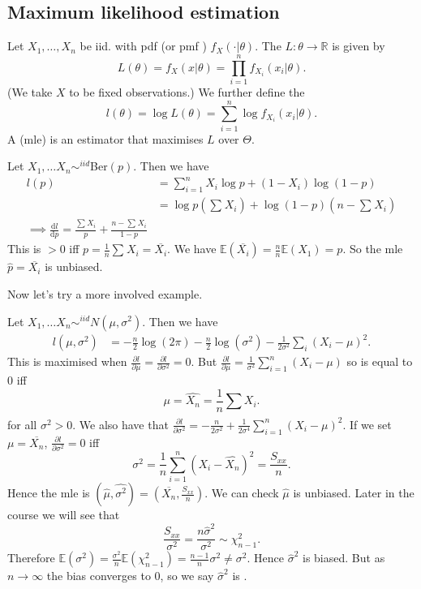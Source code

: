 \documentclass[egregdoesnotlikesansseriftitles,a4paper]{scrartcl}
\begin{document}
\subsection{Maximum likelihood estimation}
\begin{definition*}
     Let $X_1 , \ldots ,X_n $ be iid. with pdf (or pmf ) $f_{X}(\cdot | \theta)$. The  $L: \theta \rightarrow \mathbb{R}$ is given by \[
     L (\theta)=f_{X}(x| \theta)=\prod_{i=1}^n f_{X_i}(x_{i}| \theta)
     .\] (We take $X$ to be fixed observations.) We further define the  \[
     l (\theta)=\log L (\theta)=\sum_{i=1}^{n}\log f_{X_i}(x_{i}| \theta)
     .\]A  (mle) is an estimator that maximises $L$ over $\Theta$.
\end{definition*}
\begin{example*}
      Let $X_1 , \ldots X_n \sim^{iid} $Ber$(p)$. Then we have
      \begin{align*}
          l (p)&=\sum_{i=1}^{n }X_{i} \log p+ (1-X_i) \log (1-p)\\
          &=\log p (\sum_{}^{}X_{i})+\log (1-p)(n-\sum_{}^{}X_i)\\
          \implies \frac{\mathrm{d}l}{\mathrm{d}p}= \frac{\sum_{}^{}X_i}{p}+ \frac{n-\sum_{}^{}X_i}{1-p}
      \end{align*}
      This is $>0$ iff $p=\frac{1}{n}\sum_{}^{}X_i= \overline{X_i}$. We have $\mathbb{E} (\overline{X_i})=\frac{n}{n}\mathbb{E} (X_1 )=p$. So the mle $\hat{p} =\overline{X_i}$ is unbiased.
\end{example*}
Now let's try a more involved example.
\begin{example*}
      Let $X_1 , \ldots X_n \sim^{iid} N(\mu, \sigma^2)$. Then we have
      \begin{align*}
           l (\mu, \sigma^2)&=-\frac{n}{2}\log ( 2\pi)-\frac{n}{2 }\log (\sigma^2)-\frac{1}{2\sigma^2 }\sum_{i}^{}(X_i-\mu)^2.
      \end{align*}
      This is maximised when $\frac{\partial l}{\partial \mu}=\frac{\partial l}{\partial \sigma^2}=0$. But $\frac{\partial l}{\partial \mu}=\frac{1}{\sigma^2}\sum_{i=1}^{n}(X_i-\mu)$ so is equal to 0 iff \[
      \mu=\hat{X_n}=\frac{1}{n}\sum_{}^{}X_i
      .\] for all $\sigma^2 >0$.
      We also have that $\frac{\partial l}{\partial \sigma^2}=-\frac{n}{2\sigma^2}+\frac{1}{2\sigma^4} \sum_{i=1}^{n}(X_i-\mu)^2$.
      If we set $\mu=\overline{X_n}$, $\frac{\partial l}{\partial \sigma^2}=0$ iff \[
      \sigma^2= \frac{1}{n} \sum_{i=1}^{n}(X_i-\hat{X_n})^2= \frac{S_{xx}}{n}
      .\] Hence the mle is $(\hat{\mu},\hat{\sigma^2})=(\overline{X_n},\frac{S_{xx}}{n}) $. We can check $\hat{\mu}$ is unbiased. Later in the course we will see that \[
          \frac{S_{xx}}{\sigma^2}=\frac{n \hat{\sigma}^2}{\sigma^2} \sim \chi_{n-1}^2
      .\] Therefore $\mathbb{E} (\sigma^2)= \frac{\sigma^2}{n}\mathbb{E}(\chi_{n-1}^2)= \frac{n-1}{n}\sigma^2 \neq \sigma^2.$ Hence $\hat{\sigma}^2$ is biased. But as $n \rightarrow \infty$ the bias converges to 0, so we say $\hat{\sigma}^2$ is . 
\end{example*}
\end{document}
